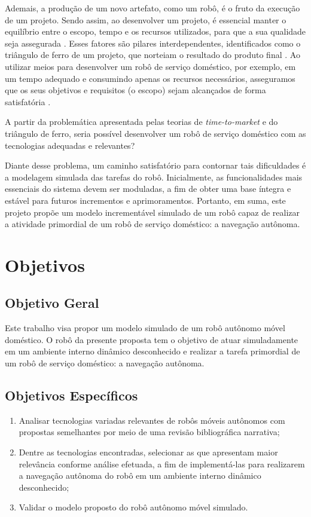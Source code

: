Ademais, a produção de um novo artefato, como um robô, é o fruto da execução de um projeto. Sendo assim, ao desenvolver um projeto, é essencial manter o equilíbrio entre o escopo, tempo e os recursos utilizados, para que a sua qualidade seja assegurada \cite{pmbok}. Esses fatores são pilares interdependentes, identificados como o triângulo de ferro de um projeto, que norteiam o resultado do produto final \cite{pmbok}. Ao utilizar meios para desenvolver um robô de serviço doméstico, por exemplo, em um tempo adequado e consumindo apenas os recursos necessários, asseguramos que os seus objetivos e requisitos (o escopo) sejam alcançados de forma satisfatória \cite{pmbok}.

A partir da problemática apresentada pelas teorias de \textit{time-to-market} e do triângulo de ferro,
seria possível desenvolver um robô de serviço doméstico com as tecnologias adequadas e relevantes?

Diante desse problema, um caminho satisfatório para contornar tais dificuldades é a modelagem simulada das tarefas do robô. Inicialmente, as funcionalidades mais essenciais do sistema devem ser moduladas, a fim de obter uma base íntegra e estável para futuros incrementos e aprimoramentos. Portanto, em suma, este projeto propõe um modelo incrementável simulado de um robô capaz de realizar a atividade primordial de um robô de serviço doméstico: a navegação autônoma.

\section{Objetivos}
\label{sec-objetivos}

\subsection{Objetivo Geral}

Este trabalho visa propor um modelo simulado de um robô autônomo móvel doméstico. O robô da presente proposta tem o objetivo de atuar simuladamente em um ambiente interno dinâmico desconhecido e realizar a tarefa primordial de um robô de serviço doméstico: a navegação autônoma.

\subsection{Objetivos Específicos}
\begin{enumerate}
  \item  Analisar tecnologias variadas relevantes de robôs móveis autônomos com propostas semelhantes por meio de uma revisão bibliográfica narrativa;
  \item Dentre as tecnologias encontradas, selecionar as que apresentam maior relevância conforme análise efetuada, a fim de implementá-las para realizarem a navegação autônoma do robô em um ambiente interno dinâmico desconhecido;
  \item Validar o modelo proposto do robô autônomo móvel simulado.
\end{enumerate}

